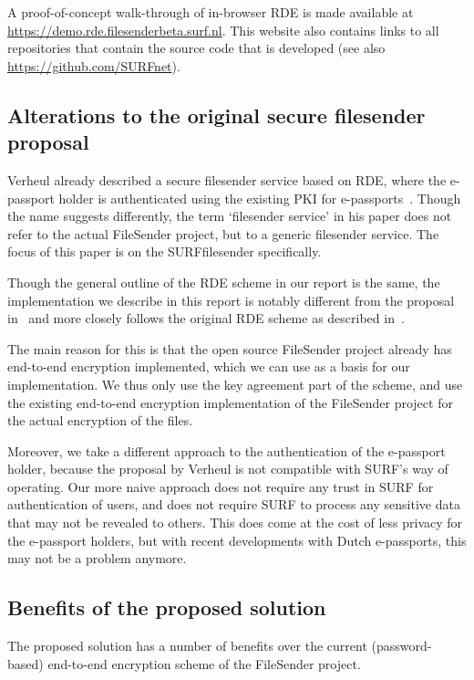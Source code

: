A proof-of-concept walk-through of in-browser RDE is made available at \url{https://demo.rde.filesenderbeta.surf.nl}.
This website also contains links to all repositories that contain the source code that is developed (see also \url{https://github.com/SURFnet}).

\subsection{Alterations to the original secure filesender proposal}\label{subsec:alterations-to-the-rde-scheme}
Verheul already described a secure filesender service based on RDE, where the e-passport holder is authenticated using the existing PKI for e-passports~\cite{verheul2020secure}.
Though the name suggests differently, the term `filesender service' in his paper does not refer to the actual FileSender project, but to a generic filesender service.
The focus of this paper is on the SURFfilesender specifically.

Though the general outline of the RDE scheme in our report is the same, the implementation we describe in this report is notably different from the proposal in~\cite{verheul2020secure} and more closely follows the original RDE scheme as described in~\cite{verheul2017remote}.

The main reason for this is that the open source FileSender project already has end-to-end encryption implemented, which we can use as a basis for our implementation.
We thus only use the key agreement part of the scheme, and use the existing end-to-end encryption implementation of the FileSender project for the actual encryption of the files.

Moreover, we take a different approach to the authentication of the e-passport holder, because the proposal by Verheul is not compatible with SURF's way of operating.
Our more naive approach does not require any trust in SURF for authentication of users, and does not require SURF to process any sensitive data that may not be revealed to others.
This does come at the cost of less privacy for the e-passport holders, but with recent developments with Dutch e-passports, this may not be a problem anymore.

\subsection{Benefits of the proposed solution}\label{subsec:benefits-of-the-proposed-solution}
The proposed solution has a number of benefits over the current (password-based) end-to-end encryption scheme of the FileSender project.

